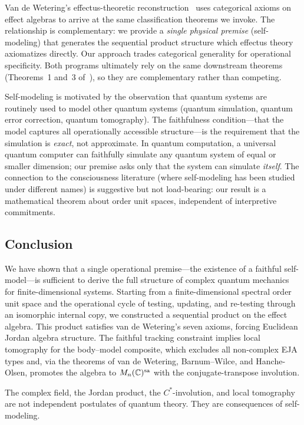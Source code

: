 \begin{remark}
\label{rem:effectus-objection}
Van de Wetering's effectus-theoretic
reconstruction~\cite{vandeWetering2019} uses categorical axioms on
effect algebras to arrive at the same classification theorems we
invoke.  The relationship is complementary: we provide a \emph{single
physical premise} (self-modeling) that generates the sequential
product structure which effectus theory axiomatizes directly.  Our
approach trades categorical generality for operational specificity.
Both programs ultimately rely on the same downstream theorems
(Theorems~1 and~3 of~\cite{vandeWetering2019b}), so they are
complementary rather than competing.
\end{remark}

\begin{remark}
\label{rem:motivation-objection}
Self-modeling is motivated by the observation that quantum systems are
routinely used to model other quantum systems (quantum simulation, quantum
error correction, quantum tomography).  The faithfulness condition---that
the model captures all operationally accessible structure---is the
requirement that the simulation is \emph{exact}, not approximate.  In
quantum computation, a universal quantum computer can faithfully
simulate any quantum system of equal or smaller dimension; our premise
asks only that the system can simulate \emph{itself}.  The connection
to the consciousness literature (where self-modeling has been studied
under different names) is suggestive but not load-bearing: our result
is a mathematical theorem about order unit spaces, independent of
interpretive commitments.
\end{remark}


\subsection{Conclusion}\label{subsec:conclusion}

We have shown that a single operational premise---the existence of a
faithful self-model---is sufficient to derive the full structure of
complex quantum mechanics for finite-dimensional systems.  Starting from
a finite-dimensional spectral order unit space and the operational
cycle of testing, updating, and re-testing through an isomorphic
internal copy, we constructed a sequential product on the effect
algebra.  This product satisfies van de Wetering's seven axioms,
forcing Euclidean Jordan algebra structure.  The faithful tracking
constraint implies local tomography for the body--model composite,
which excludes all non-complex EJA types and, via the theorems of
van de Wetering, Barnum--Wilce, and Hanche-Olsen, promotes the algebra
to $M_{n}(\mathbb{C})^{\mathrm{sa}}$ with the conjugate-transpose involution.

The complex field, the Jordan product, the $C^{*}$-involution, and
local tomography are not independent postulates of quantum theory.
They are consequences of self-modeling.
